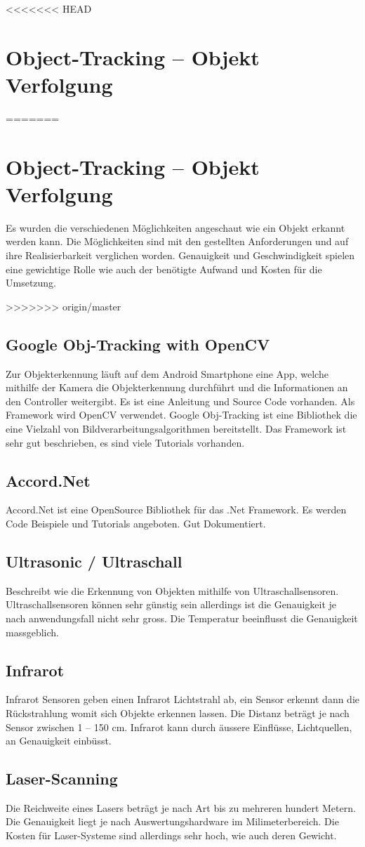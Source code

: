 <<<<<<< HEAD
﻿\section{Object-Tracking – Objekt Verfolgung}
=======
\section{Object-Tracking – Objekt Verfolgung}
Es wurden die verschiedenen Möglichkeiten angeschaut wie ein Objekt erkannt werden kann. Die Möglichkeiten sind mit den gestellten Anforderungen und auf ihre Realisierbarkeit verglichen worden. Genauigkeit und Geschwindigkeit spielen eine gewichtige Rolle wie auch der benötigte Aufwand und Kosten für die Umsetzung.

>>>>>>> origin/master
\subsection{Google Obj-Tracking with OpenCV}
Zur Objekterkennung läuft auf dem Android Smartphone eine App, welche mithilfe der Kamera die Objekterkennung durchführt und die Informationen an den Controller weitergibt. Es ist eine Anleitung und Source Code vorhanden. Als Framework wird OpenCV verwendet. Google Obj-Tracking ist eine Bibliothek die eine Vielzahl von Bildverarbeitungsalgorithmen bereitstellt. Das Framework ist sehr gut beschrieben, es sind viele Tutorials vorhanden.

\subsection{Accord.Net}
Accord.Net ist eine OpenSource Bibliothek für das .Net Framework. Es werden Code Beispiele und Tutorials angeboten. Gut Dokumentiert.

\subsection{Ultrasonic / Ultraschall }
Beschreibt wie die Erkennung von Objekten mithilfe von Ultraschallsensoren. Ultraschallsensoren können sehr günstig sein allerdings ist die Genauigkeit je nach anwendungsfall nicht sehr gross. Die Temperatur beeinflusst die Genauigkeit massgeblich. 

\subsection{Infrarot}
Infrarot Sensoren geben einen Infrarot Lichtstrahl ab, ein Sensor erkennt dann die Rückstrahlung womit sich Objekte erkennen lassen. Die Distanz beträgt je nach Sensor zwischen 1 – 150 cm. Infrarot kann durch äussere Einflüsse, Lichtquellen, an Genauigkeit einbüsst.

\subsection{Laser-Scanning}
Die Reichweite eines Lasers beträgt je nach Art bis zu mehreren hundert Metern. Die Genauigkeit liegt je nach Auswertungshardware im Milimeterbereich. Die Kosten für Laser-Systeme sind allerdings sehr hoch, wie auch deren Gewicht.

